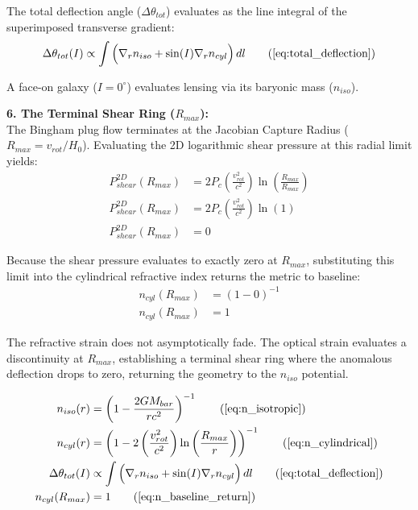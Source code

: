 The total deflection angle ($\Delta \theta_{tot}$) evaluates as the line integral of the superimposed transverse gradient:
\begin{equation}
    \Delta \theta_{tot}(I) \propto \int \Big( \nabla_r n_{iso} + \sin(I) \nabla_r n_{cyl} \Big) \, dl \tag{\ref{eq:total_deflection}}
\end{equation}

A face-on galaxy ($I=0^\circ$) evaluates lensing via its baryonic mass ($n_{iso}$).

\textbf{6. The Terminal Shear Ring ($R_{max}$):} \\
The Bingham plug flow terminates at the Jacobian Capture Radius ($R_{max} = v_{rot}/H_0$). Evaluating the 2D logarithmic shear pressure at this radial limit yields: 
\begin{align}
    P_{shear}^{2D}(R_{max}) &= 2P_c \left(\frac{v_{rot}^2}{c^2}\right) \ln \left( \frac{R_{max}}{R_{max}} \right) \nonumber \\
    P_{shear}^{2D}(R_{max}) &= 2P_c \left(\frac{v_{rot}^2}{c^2}\right) \ln (1) \nonumber \\
    P_{shear}^{2D}(R_{max}) &= 0 \label{eq:terminal_shear_zero}
\end{align}

Because the shear pressure evaluates to exactly zero at $R_{max}$, substituting this limit into the cylindrical refractive index returns the metric to baseline:
\begin{align}
    n_{cyl}(R_{max}) &= \left( 1 - 0 \right)^{-1} \nonumber \\
    n_{cyl}(R_{max}) &= 1 \label{eq:n_baseline_return}
\end{align}

The refractive strain does not asymptotically fade. The optical strain evaluates a discontinuity at $R_{max}$, establishing a terminal shear ring where the anomalous deflection drops to zero, returning the geometry to the $n_{iso}$ potential.

\begin{tcolorbox}[recallbox, title={\ref{box:galactic_lensing}. Galactic Lensing (Stress Birefringence)}] 
\begin{align}
    n_{iso}(r) &= \left( 1 - \frac{2G M_{bar}}{r c^2} \right)^{-1} \tag{\ref{eq:n_isotropic}} \\
    n_{cyl}(r) &= \left( 1 - 2\left(\frac{v_{rot}^2}{c^2}\right) \ln \left( \frac{R_{max}}{r} \right) \right)^{-1} \tag{\ref{eq:n_cylindrical}} \\
    \Delta \theta_{tot}(I) &\propto \int \Big( \nabla_r n_{iso} + \sin(I) \nabla_r n_{cyl} \Big) \, dl \tag{\ref{eq:total_deflection}} \\
    n_{cyl}(R_{max}) &= 1 \tag{\ref{eq:n_baseline_return}}
\end{align}
\end{tcolorbox}


